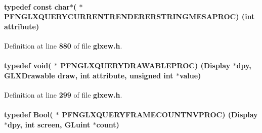 \paragraph[{P\+F\+N\+G\+L\+X\+Q\+U\+E\+R\+Y\+C\+U\+R\+R\+E\+N\+T\+R\+E\+N\+D\+E\+R\+E\+R\+S\+T\+R\+I\+N\+G\+M\+E\+S\+A\+P\+R\+OC}]{\setlength{\rightskip}{0pt plus 5cm}typedef const char$\ast$( $\ast$  P\+F\+N\+G\+L\+X\+Q\+U\+E\+R\+Y\+C\+U\+R\+R\+E\+N\+T\+R\+E\+N\+D\+E\+R\+E\+R\+S\+T\+R\+I\+N\+G\+M\+E\+S\+A\+P\+R\+OC) ({\bf int} attribute)}\label{glxew_8h_adc05dc6e1ac0d861ecb9ad072db76950}


Definition at line {\bf 880} of file {\bf glxew.\+h}.

\paragraph[{P\+F\+N\+G\+L\+X\+Q\+U\+E\+R\+Y\+D\+R\+A\+W\+A\+B\+L\+E\+P\+R\+OC}]{\setlength{\rightskip}{0pt plus 5cm}typedef {\bf void}( $\ast$  P\+F\+N\+G\+L\+X\+Q\+U\+E\+R\+Y\+D\+R\+A\+W\+A\+B\+L\+E\+P\+R\+OC) (Display $\ast$dpy, {\bf G\+L\+X\+Drawable} draw, {\bf int} attribute, unsigned {\bf int} $\ast$value)}\label{glxew_8h_a26cd4e8852edc6e3b2dffcab17b4cb33}


Definition at line {\bf 299} of file {\bf glxew.\+h}.

\paragraph[{P\+F\+N\+G\+L\+X\+Q\+U\+E\+R\+Y\+F\+R\+A\+M\+E\+C\+O\+U\+N\+T\+N\+V\+P\+R\+OC}]{\setlength{\rightskip}{0pt plus 5cm}typedef Bool( $\ast$  P\+F\+N\+G\+L\+X\+Q\+U\+E\+R\+Y\+F\+R\+A\+M\+E\+C\+O\+U\+N\+T\+N\+V\+P\+R\+OC) (Display $\ast$dpy, {\bf int} screen, {\bf G\+Luint} $\ast${\bf count})}\label{glxew_8h_a5975d8215e5065fcf86059a836d8a0b9}


